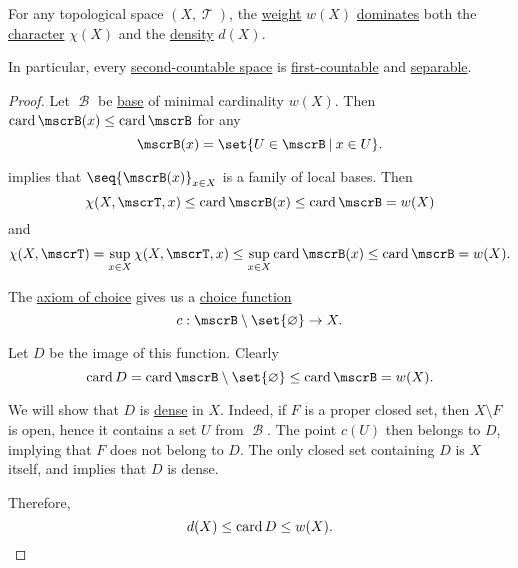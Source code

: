 \begin{proposition}\label{thm:topological_space_countability}
  For any topological space \( (X, \mscrT) \), the \hyperref[def:topological_space_weight]{weight} \( w(X) \) \hyperref[def:equinumerosity]{dominates} both the \hyperref[def:topological_space_character]{character} \( \chi(X) \) and the \hyperref[def:topological_space_density]{density} \( d(X) \).

  In particular, every \hyperref[def:topological_space_weight]{second-countable space} is \hyperref[def:topological_space_character]{first-countable} and \hyperref[def:topological_space_density]{separable}.
\end{proposition}
\begin{proof}
   Let \( \mscrB \) be \hyperref[def:topological_base]{base} of minimal cardinality \( w(X) \). Then \( \card \mscrB(x) \leq \card \mscrB \) for any
  \begin{equation*}
    \mscrB(x) = \set{ U \in \mscrB \given x \in U }.
  \end{equation*}

   implies that \( \seq{ \mscrB(x) }_{x \in X} \) is a family of local bases. Then
  \begin{equation*}
    \chi(X, \mscrT, x) \leq \card \mscrB(x) \leq \card \mscrB = w(X)
  \end{equation*}
  and
  \begin{equation*}
    \chi(X, \mscrT) = \sup_{x \in X} \chi(X, \mscrT, x) \leq \sup_{x \in X} \card \mscrB(x) \leq \card \mscrB = w(X).
  \end{equation*}

   The \hyperref[def:zfc/choice]{axiom of choice} gives us a \hyperref[def:choice_function]{choice function}
  \begin{equation*}
    c: \mscrB \setminus \set{ \varnothing } \to X.
  \end{equation*}

  Let \( D \) be the image of this function. Clearly
  \begin{equation*}
    \card D = \card \mscrB \setminus \set{ \varnothing } \leq \card \mscrB = w(X).
  \end{equation*}

  We will show that \( D \) is \hyperref[def:topologically_dense_set]{dense} in \( X \). Indeed, if \( F \) is a proper closed set, then \( X \setminus F \) is open, hence it contains a set \( U \) from \( \mscrB \). The point \( c(U) \) then belongs to \( D \), implying that \( F \) does not belong to \( D \). The only closed set containing \( D \) is \( X \) itself, and  implies that \( D \) is dense.

  Therefore,
  \begin{equation*}
    d(X) \leq \operatorname{card} D \leq w(X).
  \end{equation*}
\end{proof}

